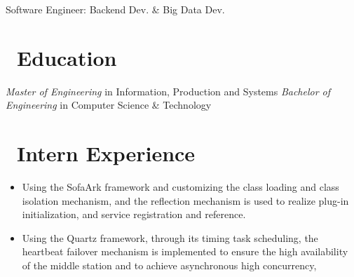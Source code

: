 \documentclass{resume}
\begin{document}


\vspace{-0.5ex}
\centerline{Software Engineer: Backend Dev. \& Big Data Dev.}
\vspace{1ex}
\vspace{-1.5ex}
 
\section{\faGraduationCap\ Education}
\vspace{-0.5ex}
\vspace{-0.5ex}
\textit{Master of Engineering} in Information, Production and Systems
\vspace{-1ex}
\vspace{-0.5ex}
\textit{Bachelor of Engineering} in Computer Science \& Technology
\vspace{-0.6ex}

\section{\faSitemap\ Intern Experience}
\vspace{-0.5ex}
\begin{itemize}
  \item Using the SofaArk framework and customizing the class loading and class isolation mechanism, and the reflection mechanism is used to realize plug-in initialization, and service registration and reference.
  \item Using the Quartz framework, through its timing task scheduling, the heartbeat failover mechanism is implemented to ensure the high availability of the middle station and to achieve asynchronous high concurrency,
\end{itemize}
\vspace{-2.5ex}
\end{document}
